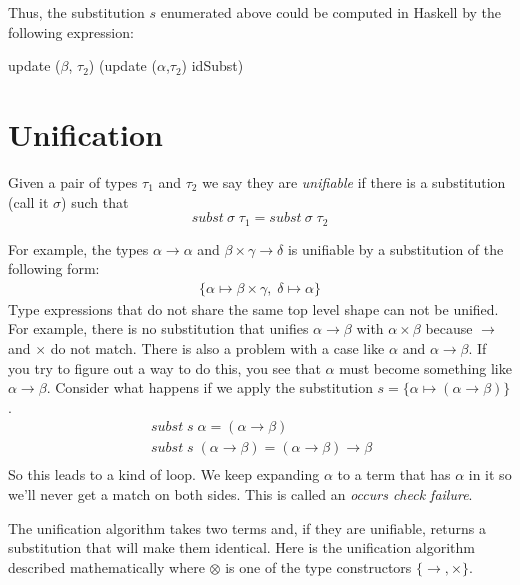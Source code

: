 \documentclass[11pt]{article}
\begin{document}
Thus, the substitution $s$ enumerated above could be computed in Haskell by the following expression:
\begin{smallprogram*}
\> update ($\beta$, $\tau_2$) (update ($\alpha$,$\tau_2$) idSubst) \\
\end{smallprogram*} 



\section{Unification}

Given a pair of types $\tau_1$ and $\tau_2$ we say they are {\em{unifiable}} if
there is a substitution (call it $\sigma$) such that
\[{\mathit{subst\ }} \sigma \;\tau_1 = {\mathit{subst\ }} \sigma\; \tau_2\]

For example, the types $\alpha\rightarrow\alpha$ and
$\beta\times\gamma\rightarrow\delta$ is unifiable by a substitution of the
following form:
\[\begin{array}{l}
\{\alpha \mapsto  \beta\times\gamma,\; \delta \mapsto \alpha\}
\end{array}\]
Type expressions that do not share the same top level shape can not be unified.
For example, there is no substitution that unifies $\alpha\rightarrow\beta$
with $\alpha\times\beta$ because $\rightarrow$ and $\times$ do not match.
There is also a problem with a case like $\alpha$ and $\alpha\rightarrow\beta$.
If you try to figure out a way to do this, you see that $\alpha$ must become
something like $\alpha\rightarrow\beta$.  Consider what happens if we apply the
substitution $s = \{\alpha\mapsto(\alpha\rightarrow\beta)\}$.
\[\begin{array}{l}
\> {\mathit{subst}}\;s\;\alpha = (\alpha\rightarrow\beta)\\
\> {\mathit{subst}}\;s\; (\alpha\rightarrow\beta) = (\alpha\rightarrow\beta)\rightarrow\beta\\
\end{array}\]
So this leads to a kind of loop.  We keep expanding $\alpha$ to a term that has
$\alpha$ in it so we'll never get a match on both sides. This is called an
{\em{occurs check failure}}.


The unification algorithm takes two terms and, if they are unifiable, returns a
substitution that will make them identical.  Here is the unification algorithm
described mathematically where $\otimes$ is one of the type constructors
$\{\rightarrow,\times\}$.
\end{document}

